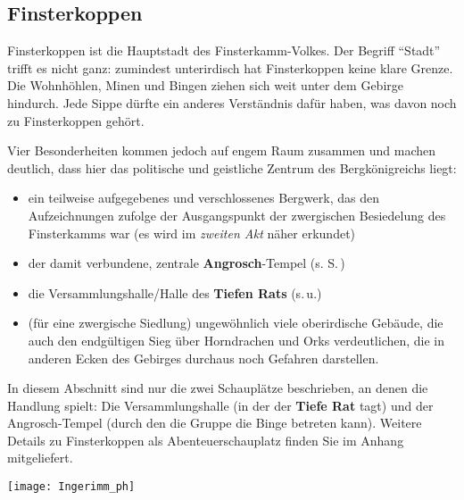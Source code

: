 \subsection{Finsterkoppen}
Finsterkoppen ist die Hauptstadt des Finsterkamm-Volkes.
Der Begriff \enquote{Stadt} trifft es nicht ganz: zumindest unterirdisch hat Finsterkoppen keine klare Grenze.
Die Wohnhöhlen, Minen und Bingen ziehen sich weit unter dem Gebirge hindurch.
Jede Sippe dürfte ein anderes Verständnis dafür haben, was davon noch zu Finsterkoppen gehört.

Vier Besonderheiten kommen jedoch auf engem Raum zusammen und machen deutlich, dass hier das politische und geistliche Zentrum des Bergkönigreichs liegt:
\begin{itemize}
	\item ein teilweise aufgegebenes und verschlossenes Bergwerk, das den Aufzeichnungen zufolge der Ausgangspunkt der zwergischen Besiedelung des Finsterkamms war (es wird im \emph{zweiten Akt} näher erkundet)
	\item der damit verbundene, zentrale \textbf{Angrosch}-Tempel (s. S.\,\pageref{angrosch})
	\item die Versammlungshalle/Halle des \textbf{Tiefen Rats} (s.\,u.)
	\item (für eine zwergische Siedlung)  ungewöhnlich viele oberirdische Gebäude, die auch den endgültigen Sieg über Horndrachen und Orks verdeutlichen,
	die in anderen Ecken des Gebirges durchaus noch Gefahren darstellen.
\end{itemize}

In diesem Abschnitt sind nur die zwei Schauplätze beschrieben, an denen die Handlung spielt: Die Versammlungshalle (in der der \textbf{Tiefe Rat} tagt) und der Angrosch-Tempel (durch den die Gruppe die Binge betreten kann). Weitere Details zu Finsterkoppen als Abenteuerschauplatz finden Sie im Anhang mitgeliefert.


\begin{center}
\vspace{-0.4cm}
\texttt{[image: Ingerimm\_ph]}
\vspace{-0.5cm}
\end{center}

